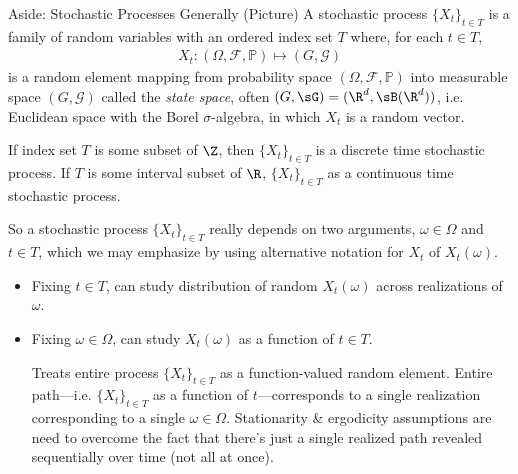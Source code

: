 \documentclass[aspectratio=169, handout]{beamer}
\begin{document}
{\scriptsize
\begin{frame}{Aside: Stochastic Processes Generally (Picture)}
A \alert{stochastic process} $\{X_t\}_{t\in T}$ is a family of random
variables with an ordered index set $T$ where, for each $t\in T$,
\begin{align*}
  X_t: (\Omega,\mathscr{F},\mathbb{P})\mapsto (G,\mathscr{G})
\end{align*}
is a random element mapping from probability space
$(\Omega,\mathscr{F},\mathbb{P})$ into measurable space
$(G,\mathscr{G})$ called the \emph{state space}, often
$(G,\sG)=(\R^d,\sB(\R^d))$, i.e. Euclidean
space with the Borel $\sigma$-algebra, in which $X_t$ is a random
vector.

If index set $T$ is some subset of $\Z$, then
$\{X_t\}_{t\in T}$ is a \alert{discrete time} stochastic process.  If
$T$ is some interval subset of $\R$, $\{X_t\}_{t\in T}$ as a
\alert{continuous time} stochastic process.

So a stochastic process $\{X_t\}_{t\in T}$ really depends on two
arguments, $\omega\in\Omega$ and $t\in T$, which we may emphasize by
using alternative notation for $X_t$ of $X_t(\omega)$.
\begin{itemize}
  \item Fixing $t\in T$, can study distribution of random
    $X_t(\omega)$ across realizations of $\omega$.
  \item Fixing $\omega\in\Omega$, can study $X_t(\omega)$ as a
    \alert{function} of $t\in T$.

    Treats entire process $\{X_t\}_{t\in T}$ as a
    \alert{function-valued} random element.
    Entire path---i.e. $\{X_t\}_{t\in T}$ as a function of
    $t$---corresponds to a single realization corresponding to a single
    $\omega\in\Omega$.
    Stationarity \& ergodicity assumptions are need to overcome the fact
    that there's just a single realized path revealed sequentially over
    time (not all at once).
\end{itemize}
\end{frame}
}


\end{document}
